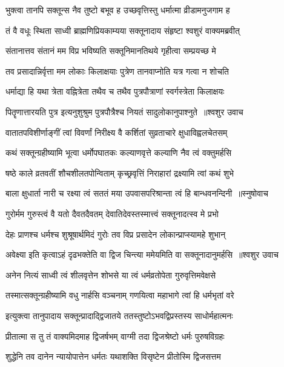 \twolineshloka
{भुक्त्वा तानपि सक्तून्स नैव तुष्टो बभूव ह}
{उच्छवृत्तिस्तु धर्मात्मा व्रीडामनुजगाम ह}


\twolineshloka
{तं वै वधूः स्थिता साध्वी ब्राह्मणिप्रियकाम्यया}
{सक्तूनादाय संहृष्टा श्वशुरं वाक्यमब्रवीत्}


\twolineshloka
{संतानात्तव संतानं मम विप्र भविष्यति}
{सक्तूनिमानतिथये गृहीत्वा सम्प्रयच्छ मे}


\twolineshloka
{तव प्रसादान्निर्वृत्ता मम लोकाः किलाक्षयाः}
{पुत्रेण तानवाप्नोति यत्र गत्वा न शोचति}


\twolineshloka
{धर्माद्या हि यथा त्रेता वह्नित्रेता तथैव च}
{तथैव पुत्रपौत्राणां स्वर्गस्त्रेता किलाक्षयः}


\threelineshloka
{पितॄणात्तारयति पुत्र इत्यनुशुश्रुम}
{पुत्रपौत्रैश्च नियतं सादुलोकानुपाश्नुते ॥श्वशुर उवाच}
{}


\twolineshloka
{वातातपविशीर्णाङ्गीं त्वां विवर्णां निरीक्ष्य वै}
{कर्शितां सुव्रताचारे क्षुधाविह्वलचेतसम्}


\twolineshloka
{कथं सक्तून्ग्रहीष्यामि भूत्वा धर्मोपघातकः}
{कल्याणवृत्ते कल्याणि नैव त्वं वक्तुमर्हसि}


\twolineshloka
{षष्ठे काले व्रतवतीं शौचशीलतपोन्विताम्}
{कृच्छ्रवृत्तिं निराहारां द्रक्ष्यामि त्वां कथं शुभे}


\threelineshloka
{बाला क्षुधार्ता नारी च रक्ष्या त्वं सततं मया}
{उपवासपरिश्रान्ता त्वं हि बान्धवनन्दिनी ॥स्नुषोवाच}
{}


\twolineshloka
{गुरोर्मम गुरुस्त्वं वै यतो दैवतदैवतम्}
{देवातिदेवस्तस्मात्त्वं सक्तूनादत्स्व मे प्रभो}


\twolineshloka
{देहः प्राणश्च धर्मश्च शुश्रूषार्थमिदं गुरोः}
{तव विप्र प्रसादेन लोकान्प्राप्स्यामहे शुभान्}


\threelineshloka
{अवेक्ष्या इति कृत्वाऽहं दृढभक्तेति वा द्विज}
{चिन्त्या ममेयमिति वा सक्तूनादानुमर्हसि ॥श्वशुर उवाच}
{}


\twolineshloka
{अनेन नित्यं साध्वी त्वं शीलवृत्तेन शोभसे}
{या त्वं धर्मव्रतोपेता गुरुवृत्तिमवेक्षसे}


\twolineshloka
{तस्मात्सक्तून्ग्रहीष्यामि वधु नार्हसि वञ्चनाम्}
{गणयित्वा महाभागे त्वां हि धर्मभृतां वरे}


\twolineshloka
{इत्युक्त्वा तानुपादाय सक्तून्प्रादाद्द्विजातये}
{ततस्तुष्टोऽभवद्विप्रस्तस्य साधोर्महात्मनः}


\twolineshloka
{प्रीतात्मा स तु तं वाक्यमिदमाह द्विजर्षभम्}
{वाग्मी तदा द्विजश्रेष्टो धर्मः पुरुषविग्रहः}


\twolineshloka
{शुद्धेनि तव दानेन न्यायोपात्तेन धर्मतः}
{यथाशक्ति विसृष्टेन प्रीतोस्मि द्विजसत्तम}


